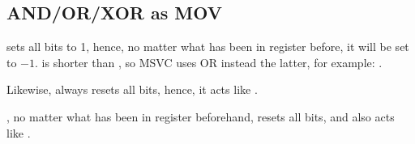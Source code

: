 \subsection{AND/OR/XOR as MOV}

 sets all bits to 1, hence, no matter what has been in register before, it will be set to $-1$.
 is shorter than , so MSVC uses OR instead the latter,
for example: .

Likewise,  always resets all bits, hence, it acts like .

, no matter what has been in register beforehand, resets all bits, and also acts like .


